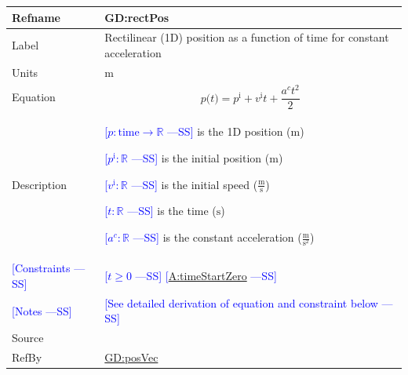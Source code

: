 \documentclass[12pt]{article}
\newcommand{\authornote}[3]{\textcolor{#1}{[#3 ---#2]}}
\newcommand{\authornote}[3]{}
\newcommand{\wss}[1]{\authornote{blue}{SS}{#1}}
\begin{document}
\medskip
\noindent
\begin{minipage}{\textwidth}
\begin{tabular}{>{\raggedright}p{}>{\raggedright\arraybackslash}p{}}
\toprule \textbf{Refname} & \textbf{GD:rectPos}
\label{GD:rectPos}
\\ \midrule
Label & Rectilinear (1D) position as a function of time for constant acceleration
        
\\ \midrule
Units & ${\text{m}}$
        
\\ \midrule
Equation & \begin{displaymath}
           p\text{(}t\text{)}={p^{\text{i}}}+{v^{\text{i}}} t+\frac{{a^{c}} t^{2}}{2}
           \end{displaymath}

\\ \midrule
Description & \begin{symbDescription}
              \item{\wss{$p: \text{time} \rightarrow \mathbb{R}$} is the 1D position (${\text{m}}$)}
              \item{\wss{${p^{\text{i}}}: \mathbb{R}$} is the initial position (${\text{m}}$)}
              \item{\wss{${v^{\text{i}}}: \mathbb{R}$} is the initial speed ($\frac{\text{m}}{\text{s}}$)}
              \item{\wss{$t: \mathbb{R}$} is the time (${\text{s}}$)}
              \item{\wss{${a^{c}}: \mathbb{R}$} is the constant acceleration ($\frac{\text{m}}{\text{s}^{2}}$)}
              \end{symbDescription}
\\ \midrule
\wss{Constraints} & \wss{$t \geq 0$} \wss{\hyperref[timeStartZero]{A:timeStartZero}}

\\ \midrule
\wss{Notes} & \wss{See detailed derivation of equation and constraint below}

\\ \midrule
Source & \cite[(pg. 8)]{hibbeler2004}
         
\\ \midrule
RefBy & \hyperref[GD:posVec]{GD:posVec}
        
\\ \bottomrule
\end{tabular}
\end{minipage}
\end{document}
